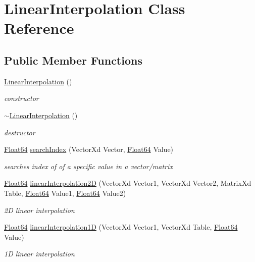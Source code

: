 \hypertarget{class_linear_interpolation}{}\section{Linear\+Interpolation Class Reference}
\label{class_linear_interpolation}
\subsection*{Public Member Functions}
\begin{DoxyCompactItemize}
\item 
\mbox{\label{class_linear_interpolation_aaae2ec77e7767bb5fc7ca34a6e1197f1}} 
\hyperlink{class_linear_interpolation_aaae2ec77e7767bb5fc7ca34a6e1197f1}{Linear\+Interpolation} ()
\begin{DoxyCompactList}\small\item\em constructor \end{DoxyCompactList}\item 
\mbox{\label{class_linear_interpolation_a36a34fa39c430e05bdc073c1ac9ad4df}} 
\hyperlink{class_linear_interpolation_a36a34fa39c430e05bdc073c1ac9ad4df}{$\sim$\+Linear\+Interpolation} ()
\begin{DoxyCompactList}\small\item\em destructor \end{DoxyCompactList}\item 
\hyperlink{group___tools_ga3f1431cb9f76da10f59246d1d743dc2c}{Float64} \hyperlink{class_linear_interpolation_a0be6504a98fabcd63d81d30a2d2d9add}{search\+Index} (Vector\+Xd Vector, \hyperlink{group___tools_ga3f1431cb9f76da10f59246d1d743dc2c}{Float64} Value)
\begin{DoxyCompactList}\small\item\em searches index of of a specific value in a vector/matrix \end{DoxyCompactList}\item 
\hyperlink{group___tools_ga3f1431cb9f76da10f59246d1d743dc2c}{Float64} \hyperlink{class_linear_interpolation_a6b143368c20db0d2cda905a86391f83f}{linear\+Interpolation2D} (Vector\+Xd Vector1, Vector\+Xd Vector2, Matrix\+Xd Table, \hyperlink{group___tools_ga3f1431cb9f76da10f59246d1d743dc2c}{Float64} Value1, \hyperlink{group___tools_ga3f1431cb9f76da10f59246d1d743dc2c}{Float64} Value2)
\begin{DoxyCompactList}\small\item\em 2D linear interpolation \end{DoxyCompactList}\item 
\hyperlink{group___tools_ga3f1431cb9f76da10f59246d1d743dc2c}{Float64} \hyperlink{class_linear_interpolation_a76b750166902dedda7e44ed0b8170094}{linear\+Interpolation1D} (Vector\+Xd Vector1, Vector\+Xd Table, \hyperlink{group___tools_ga3f1431cb9f76da10f59246d1d743dc2c}{Float64} Value)
\begin{DoxyCompactList}\small\item\em 1D linear interpolation \end{DoxyCompactList}\end{DoxyCompactItemize}


